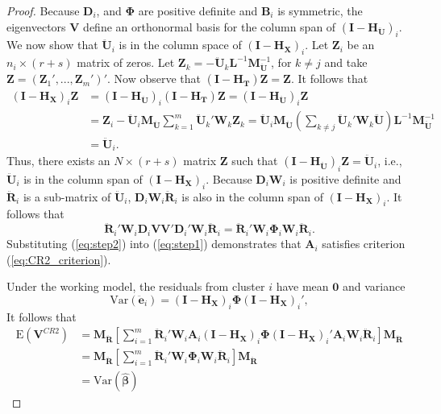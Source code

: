 \documentclass[12pt]{article}\usepackage[]{graphicx}\usepackage[]{color}
\newcommand{\E}{\text{E}}
\newcommand{\Var}{\text{Var}}
\newcommand{\bm}{\mathbf}
\newcommand{\bs}{\boldsymbol}
\begin{document}
\begin{proof}
Because $\bm{D}_i$, and $\bs\Phi$ are positive definite and $\bm{B}_i$ is symmetric, the eigenvectors $\bm{V}$ define an orthonormal basis for the column span of $\left(\bm{I} - \bm{H_{\ddot{U}}}\right)_i$.
We now show that $\bm{\ddot{U}}_i$ is in the column space of $\left(\bm{I} - \bm{H_X}\right)_i$. 
Let $\bm{Z}_i$ be an $n_i \times (r + s)$ matrix of zeros. 
Let $\bm{Z}_k = - \bm{\ddot{U}}_k \bm{L}^{-1}\bm{M}_{\bm{\ddot{U}}}^{-1}$, for $k \neq j$ and take $\bm{Z} = \left(\bm{Z}_1',...,\bm{Z}_m'\right)'$. 
Now observe that $\left(\bm{I} - \bm{H_T}\right) \bm{Z} = \bm{Z}$. 
It follows that 
\begin{align*}
\left(\bm{I} - \bm{H_X}\right)_i \bm{Z} &= \left(\bm{I} - \bm{H_{\ddot{U}}}\right)_i \left(\bm{I} - \bm{H_T}\right) \bm{Z} = \left(\bm{I} - \bm{H_{\ddot{U}}}\right)_i \bm{Z} \\
&= \bm{Z}_i - \bm{\ddot{U}}_i\bm{M_{\ddot{U}}}\sum_{k=1}^m \bm{\ddot{U}}_k'\bm{W}_k\bm{Z}_k = \bm{\ddot{U}}_i\bm{M_{\ddot{U}}} \left(\sum_{k \neq j} \bm{\ddot{U}}_k' \bm{W}_k \bm{\ddot{U}} \right) \bm{L}^{-1}\bm{M}_{\bm{\ddot{U}}}^{-1} \\
&= \bm{\ddot{U}}_i.
\end{align*}
Thus, there exists an $N \times (r + s)$ matrix $\bm{Z}$ such that $\left(\bm{I} - \bm{H_{\ddot{U}}}\right)_i \bm{Z} = \bm{\ddot{U}}_i$, i.e., $\bm{\ddot{U}}_i$ is in the column span of $\left(\bm{I} - \bm{H_X}\right)_i$. Because $\bm{D}_i \bm{W}_i$ is positive definite and $\bm{\ddot{R}}_i$ is a sub-matrix of $\bm{\ddot{U}}_i$, $\bm{D}_i\bm{W}_i\bm{\ddot{R}}_i$ is also in the column span of $\left(\bm{I} - \bm{H_X}\right)_i$. It follows that 
\begin{equation}
\label{eq:step2}
\bm{\ddot{R}}_i' \bm{W}_i \bm{D}_i \bm{V}\bm{V}' \bm{D}_i' \bm{W}_i \bm{\ddot{R}}_i = \bm{\ddot{R}}_i' \bm{W}_i \bs\Phi_i \bm{W}_i \bm{\ddot{R}}_i.
\end{equation}
Substituting (\ref{eq:step2}) into (\ref{eq:step1}) demonstrates that $\bm{A}_i$ satisfies criterion (\ref{eq:CR2_criterion}).

Under the working model, the residuals from cluster $i$ have mean $\bm{0}$ and variance \[
\Var\left(\bm{\ddot{e}}_i\right) = \left(\bm{I} - \bm{H_X}\right)_i \bs\Phi \left(\bm{I} - \bm{H_X}\right)_i',\] 
It follows that 
\begin{align*}
\E\left(\bm{V}^{CR2}\right) &= \bm{M_{\ddot{R}}}\left[\sum_{i=1}^m \bm{\ddot{R}}_i' \bm{W}_i \bm{A}_i \left(\bm{I} - \bm{H_X}\right)_i \bs\Phi \left(\bm{I} - \bm{H_X}\right)_i' \bm{A}_i \bm{W}_i \bm{\ddot{R}}_i \right] \bm{M_{\ddot{R}}} \\
&= \bm{M_{\ddot{R}}}\left[\sum_{i=1}^m \bm{\ddot{R}}_i' \bm{W}_i \bs\Phi_i \bm{W}_i \bm{\ddot{R}}_i \right] \bm{M_{\ddot{R}}} \\
&= \Var\left(\bs{\hat\beta}\right)
\end{align*}
\end{proof}
\end{document}
